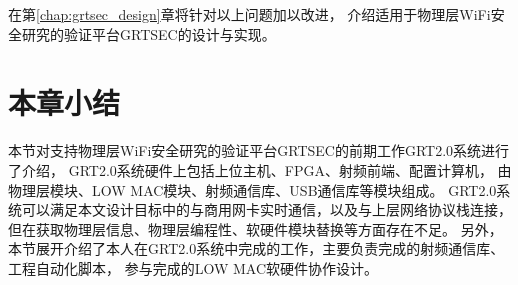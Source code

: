 	在第\ref{chap:grtsec_design}章将针对以上问题加以改进，
	介绍适用于物理层WiFi安全研究的验证平台GRTSEC的设计与实现。

	\section{本章小结}\label{sec:grt2.0_summary}
	本节对支持物理层WiFi安全研究的验证平台GRTSEC的前期工作GRT2.0系统进行了介绍，
	GRT2.0系统硬件上包括上位主机、FPGA、射频前端、配置计算机，
	由物理层模块、LOW MAC模块、射频通信库、USB通信库等模块组成。
	GRT2.0系统可以满足本文设计目标中的与商用网卡实时通信，以及与上层网络协议栈连接，
	但在获取物理层信息、物理层编程性、软硬件模块替换等方面存在不足。
	另外，本节展开介绍了本人在GRT2.0系统中完成的工作，主要负责完成的射频通信库、工程自动化脚本，
	参与完成的LOW MAC软硬件协作设计。

